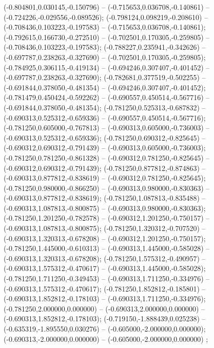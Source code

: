  (-0.804801,0.030145,-0.150796) -- (-0.715653,0.036708,-0.140861) -- (-0.724226,-0.029556,-0.089526);
 (-0.798124,0.098219,-0.208610) -- (-0.708436,0.103223,-0.197583) -- (-0.715653,0.036708,-0.140861);
 (-0.792615,0.166730,-0.272510) -- (-0.702501,0.170305,-0.259805) -- (-0.708436,0.103223,-0.197583);
 (-0.788227,0.235941,-0.342626) -- (-0.697787,0.238263,-0.327690) -- (-0.702501,0.170305,-0.259805);
 (-0.784925,0.306115,-0.419134) -- (-0.694246,0.307407,-0.401452) -- (-0.697787,0.238263,-0.327690);
 (-0.782681,0.377519,-0.502255) -- (-0.691844,0.378050,-0.481354) -- (-0.694246,0.307407,-0.401452);
 (-0.781479,0.450424,-0.592262) -- (-0.690557,0.450514,-0.567716) -- (-0.691844,0.378050,-0.481354);
 (-0.781250,0.525313,-0.687832) -- (-0.690313,0.525312,-0.659336) -- (-0.690557,0.450514,-0.567716);
 (-0.781250,0.605000,-0.767813) -- (-0.690313,0.605000,-0.736003) -- (-0.690313,0.525312,-0.659336);
 (-0.781250,0.690312,-0.825645) -- (-0.690312,0.690312,-0.791439) -- (-0.690313,0.605000,-0.736003);
 (-0.781250,0.781250,-0.861328) -- (-0.690312,0.781250,-0.825645) -- (-0.690312,0.690312,-0.791439);
 (-0.781250,0.877812,-0.874863) -- (-0.690313,0.877812,-0.838619) -- (-0.690312,0.781250,-0.825645);
 (-0.781250,0.980000,-0.866250) -- (-0.690313,0.980000,-0.830363) -- (-0.690313,0.877812,-0.838619);
 (-0.781250,1.087813,-0.835488) -- (-0.690313,1.087813,-0.800875) -- (-0.690313,0.980000,-0.830363);
 (-0.781250,1.201250,-0.782578) -- (-0.690312,1.201250,-0.750157) -- (-0.690313,1.087813,-0.800875);
 (-0.781250,1.320312,-0.707520) -- (-0.690313,1.320313,-0.678208) -- (-0.690312,1.201250,-0.750157);
 (-0.781250,1.445000,-0.610313) -- (-0.690313,1.445000,-0.585028) -- (-0.690313,1.320313,-0.678208);
 (-0.781250,1.575312,-0.490957) -- (-0.690313,1.575312,-0.470617) -- (-0.690313,1.445000,-0.585028);
 (-0.781250,1.711250,-0.349453) -- (-0.690313,1.711250,-0.334976) -- (-0.690313,1.575312,-0.470617);
 (-0.781250,1.852812,-0.185801) -- (-0.690313,1.852812,-0.178103) -- (-0.690313,1.711250,-0.334976);
 (-0.781250,2.000000,0.000000) -- (-0.690313,2.000000,0.000000) -- (-0.690313,1.852812,-0.178103);
 (-0.719150,-1.888439,0.025238) -- (-0.635319,-1.895550,0.030276) -- (-0.605000,-2.000000,0.000000);
 (-0.690313,-2.000000,0.000000) -- (-0.605000,-2.000000,0.000000) ;
